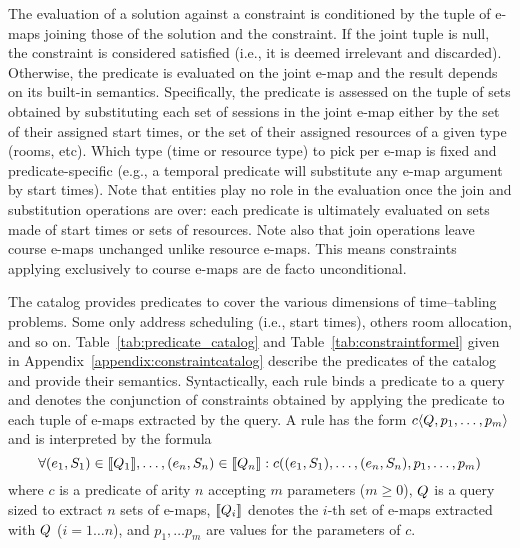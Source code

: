 \documentclass[runningheads]{llncs}
\begin{document}
The evaluation of a solution against a constraint
is conditioned by the tuple of e-maps joining those of the solution and the constraint.
If the joint tuple is null, 
the constraint is considered satisfied
(i.e., it is deemed irrelevant and discarded).
Otherwise, the predicate is evaluated on the joint e-map
and the result depends on its built-in semantics.
Specifically, the predicate is assessed on
the tuple of sets obtained by substituting each set of sessions
in the joint e-map
either by the set of their assigned start times,
or the set of their assigned resources of a given type (rooms, etc).
Which type (time or resource type) to pick per e-map is fixed and predicate-specific
(e.g., a temporal predicate will substitute any e-map argument by start times).
Note that entities play no role in the evaluation once the join and substitution operations are over:
each predicate is ultimately evaluated on sets made of start times or sets of resources.
Note also that join operations leave course e-maps unchanged unlike resource e-maps.
This means constraints applying exclusively to course e-maps are de facto unconditional. 



The \UTP{} catalog provides predicates to cover the various dimensions of time--tabling problems.
Some only address scheduling (i.e., start times),
others room allocation, and so on.
Table~\ref{tab:predicate_catalog} and Table~\ref{tab:constraintformel} given in Appendix~\ref{appendix:constraintcatalog} describe the predicates of the catalog and provide their semantics.
Syntactically, each rule binds a predicate to a query
and denotes the conjunction of constraints obtained 
by applying the predicate to
each tuple of e-maps extracted by the query.
A rule has the form $c\langle{Q},p_1,\ldots,p_m\rangle$
and is interpreted by the formula
\begin{equation*}
\forall (e_1,S_1)\in\llbracket Q_1\rrbracket,\ldots,(e_n,S_n)\in\llbracket Q_{n}\rrbracket: c((e_1,S_1),\ldots,(e_n,S_n),p_1,\ldots,p_m)
\end{equation*}
where 
$c$ is a predicate of arity $n$ accepting $m$ parameters ($m\geq0$),
$Q$ is a query sized to extract $n$ sets of e-maps,
$\llbracket Q_i\rrbracket$
denotes the $i$-th set of e-maps extracted with $Q$
 ($i=1\ldots n$),
and
$p_1,\ldots p_m$ are values for the parameters of $c$.
\end{document}
